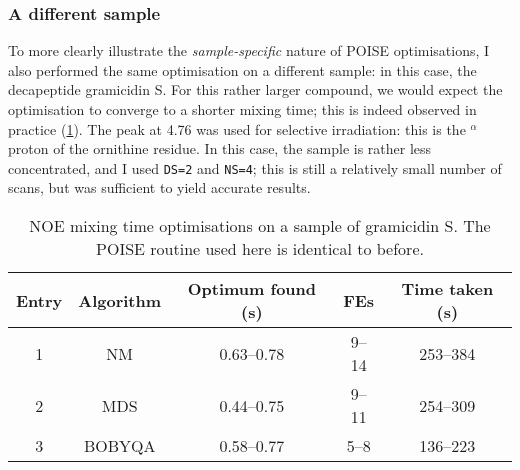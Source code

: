\subsubsection{A different sample}

To more clearly illustrate the \textit{sample-specific} nature of POISE optimisations, I also performed the same optimisation on a different sample: in this case, the decapeptide gramicidin S.
For this rather larger compound, we would expect the optimisation to converge to a shorter mixing time; this is indeed observed in practice (\cref{tbl:poise_noe_grami}).
The peak at \qty{4.76}{\ppm} was used for selective irradiation: this is the $^{\alpha}$ proton of the ornithine residue.
In this case, the sample is rather less concentrated, and I used \texttt{DS=2} and \texttt{NS=4}; this is still a relatively small number of scans, but was sufficient to yield accurate results.

\begin{table}[htb]
    \centering
    \begin{tabular}{ccccc}
        \toprule
        Entry & Algorithm & Optimum found (\unit{\s}) & FEs    & Time taken (\unit{\s}) \\
        \midrule
        1     & NM        & 0.63--0.78              & 9--14  & 253--384             \\
        2     & MDS       & 0.44--0.75              & 9--11  & 254--309             \\
        3     & BOBYQA    & 0.58--0.77              & 5--8   & 136--223             \\
        \bottomrule
    \end{tabular}
    \caption[NOE mixing time optimisations on gramicidin]{
        NOE mixing time optimisations on a sample of gramicidin S.
        The POISE routine used here is identical to before.
    }
    \label{tbl:poise_noe_grami}
\end{table}
